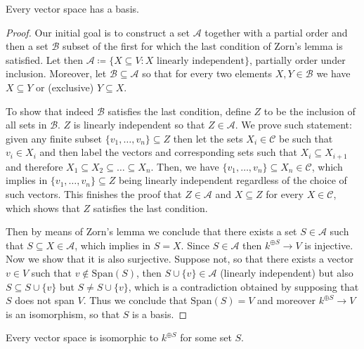 \begin{theorem}
Every vector space has a basis.
\end{theorem}

\begin{proof}
Our initial goal is to construct a set \(\mathcal A\) together with a partial
order and then a set \(\mathcal B\) subset of the first for which the last
condition of Zorn's lemma is satisfied. Let then \(\mathcal A \coloneq \{X \subseteq
V \colon X \text{ linearly independent}\}\), partially order under inclusion.
Moreover, let \(\mathcal B \subseteq \mathcal A\) so that for every two
elements \(X, Y \in \mathcal B\) we have \(X \subseteq Y\) or (exclusive) \(Y
\subseteq X\).

To show that indeed \(\mathcal B\) satisfies the last condition, define \(Z\)
to be the inclusion of all sets in \(\mathcal B\). \(Z\) is linearly
independent so that \(Z \in \mathcal A\). We prove such statement: given any
finite subset \(\{v_1, \dots, v_n\} \subseteq Z\) then let the sets \(X_i \in
\mathcal C\) be such that \(v_i \in X_i\) and then label the vectors and
corresponding sets such that \(X_i \subseteq X_{i+1}\) and therefore \(X_1
\subseteq  X_2 \subseteq  \dots \subseteq X_n\). Then, we have \(\{v_1, \dots,
v_n\} \subseteq X_n \in \mathcal C\), which implies in \(\{v_1, \dots, v_n\}
\subseteq Z\) being linearly independent regardless of the choice of such
vectors. This finishes the proof that \(Z \in \mathcal A\) and \(X \subseteq
Z\) for every \(X \in \mathcal C\), which shows that \(Z\) satisfies the last
condition.

Then by means of Zorn's lemma we conclude that there exists a set \(S \in
\mathcal A\) such that \(S \subseteq X \in \mathcal A\), which implies in \(S
= X\).  Since \(S \in \mathcal A\) then \(k^{\oplus S} \to V\) is injective.
Now we show that it is also surjective. Suppose not, so that there exists a
vector \(v \in V\) such that \(v \not\in \mathrm{Span}(S)\), then \(S \cup
\{v\} \in \mathcal A\) (linearly independent) but also \(S \subseteq S \cup
\{v\}\) but \(S \neq S \cup \{v\}\), which is a contradiction obtained by
supposing that \(S\) does not span \(V\). Thus we conclude that
\(\mathrm{Span}(S) = V\) and moreover \(k^{\oplus S} \to V\) is an
isomorphism, so that \(S\) is a basis.
\end{proof}

\begin{corollary}
Every vector space is isomorphic to \(k^{\oplus S}\) for some set \(S\).
\end{corollary}

